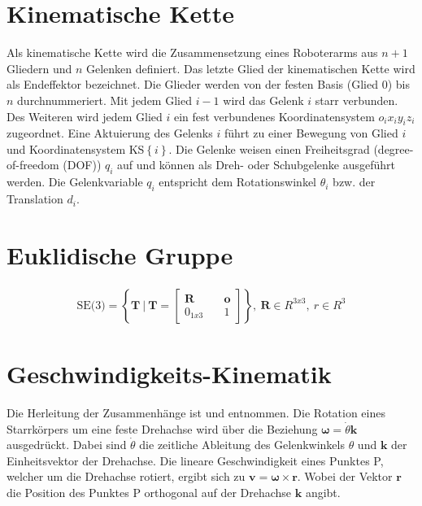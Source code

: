 \setcounter{chapter}{1}
\setcounter{section}{0}
\setcounter{table}{0}
\setcounter{figure}{0}
%
\section{Kinematische Kette}
\label{add:kinematische-kette}
Als kinematische Kette wird die Zusammensetzung eines Roboterarms aus $n+1$ Gliedern und $n$ Gelenken definiert. Das letzte Glied der kinematischen Kette wird als Endeffektor bezeichnet. Die Glieder werden von der festen Basis (Glied $0$) bis $n$ durchnummeriert. Mit jedem Glied $i-1$ wird das Gelenk $i$ starr verbunden. Des Weiteren wird jedem Glied $i$ ein fest verbundenes Koordinatensystem $o_ix_iy_iz_i$ zugeordnet. Eine Aktuierung des Gelenks $i$ führt zu einer Bewegung von Glied $i$ und Koordinatensystem KS$\left\{i\right\}$. Die Gelenke weisen einen Freiheitsgrad (degree-of-freedom (DOF)) $q_i$ auf und können als Dreh- oder Schubgelenke ausgeführt werden. Die Gelenkvariable $q_i$ entspricht dem Rotationswinkel $\theta_i$ bzw. der Translation $d_i$. \cite[S.~75]{Spong.2020}
%
\setcounter{section}{1}
\section{Euklidische Gruppe}
\label{add:SE3}
\begin{align} 
	\text{SE(3)} = \left\{{\bm{T}} \ | \ \bm{T}=\begin{bmatrix} {\bm{R}} &\quad {\bm{o}}\\ {0}_{1x3} &\quad 1 \end{bmatrix}\right\}, \ \bm{R} \in {R}^{3x3}, \ {r} \in {R}^{3}  
\end{align} 

\cite[S.~534]{Spong.2020}
\setcounter{section}{2}
\section{Geschwindigkeits-Kinematik}
\label{add:geschwindigkeitskinematik}
Die Herleitung der Zusammenhänge ist  \cite[S.~79~f.]{Kemmetmueller.2023} und  \cite[S.~106]{Spong.2020} entnommen. Die Rotation eines Starrk{\"o}rpers um eine feste Drehachse wird über die Beziehung $\bm{\omega} = \dot{\theta}\bm{k}$ ausgedr{\"u}ckt. Dabei sind $\dot{\theta}$ die zeitliche Ableitung des Gelenkwinkels $\theta$ und $\bm{k}$ der Einheitsvektor der Drehachse. Die lineare Geschwindigkeit eines Punktes P, welcher um die Drehachse rotiert, ergibt sich zu $\bm{v} = \bm{\omega} \times \bm{r}$. Wobei der Vektor $\bm{r}$ die Position des Punktes P orthogonal auf der Drehachse $\bm{k}$ angibt. \cite[S.~102]{Spong.2020} 
%
